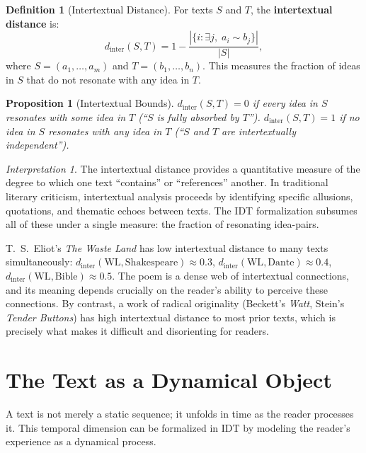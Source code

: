 \documentclass[11pt,openany]{book}
\theoremstyle{definition}
\newtheorem{definition}[axiom]{Definition}
\theoremstyle{plain}
\newtheorem{proposition}[axiom]{Proposition}
\theoremstyle{remark}
\newtheorem{interpretation}[axiom]{Interpretation}
\newcommand{\res}{\sim}                      %
\begin{document}
\begin{definition}[Intertextual Distance]
For texts $S$ and $T$, the \textbf{intertextual distance} is:
\[
d_{\text{inter}}(S, T) = 1 - \frac{|\{i : \exists j,\; a_i \res b_j\}|}{|S|},
\]
where $S = (a_1, \ldots, a_m)$ and $T = (b_1, \ldots, b_n)$. This measures the fraction of ideas in $S$ that do not resonate with any idea in $T$.
\end{definition}

\begin{proposition}[Intertextual Bounds]
$d_{\text{inter}}(S, T) = 0$ if every idea in $S$ resonates with some idea in $T$ (``$S$ is fully absorbed by $T$''). $d_{\text{inter}}(S, T) = 1$ if no idea in $S$ resonates with any idea in $T$ (``$S$ and $T$ are intertextually independent'').
\end{proposition}

\begin{interpretation}
The intertextual distance provides a quantitative measure of the degree to which one text ``contains'' or ``references'' another. In traditional literary criticism, intertextual analysis proceeds by identifying specific allusions, quotations, and thematic echoes between texts. The IDT formalization subsumes all of these under a single measure: the fraction of resonating idea-pairs.

T.~S.~Eliot's \emph{The Waste Land} has low intertextual distance to many texts simultaneously: $d_{\text{inter}}(\text{WL}, \text{Shakespeare}) \approx 0.3$, $d_{\text{inter}}(\text{WL}, \text{Dante}) \approx 0.4$, $d_{\text{inter}}(\text{WL}, \text{Bible}) \approx 0.5$. The poem is a dense web of intertextual connections, and its meaning depends crucially on the reader's ability to perceive these connections. By contrast, a work of radical originality (Beckett's \emph{Watt}, Stein's \emph{Tender Buttons}) has high intertextual distance to most prior texts, which is precisely what makes it difficult and disorienting for readers.
\end{interpretation}

\section{The Text as a Dynamical Object}

A text is not merely a static sequence; it unfolds in time as the reader processes it. This temporal dimension can be formalized in IDT by modeling the reader's experience as a dynamical process.
\end{document}
